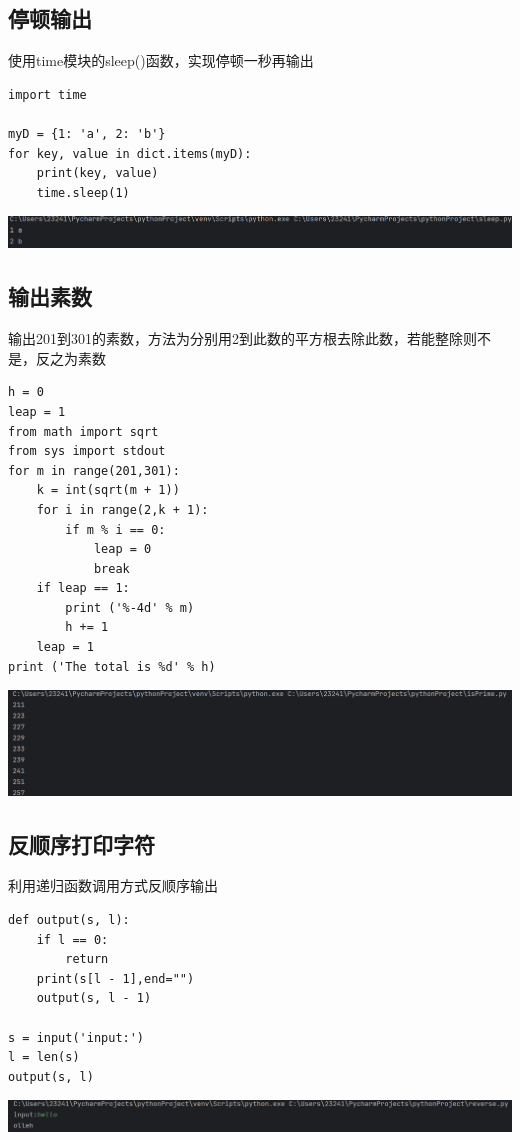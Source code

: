 \documentclass[UTF8,a4paper]{ctexart}
\begin{document}
\begin{sloppypar}
	\subsection{停顿输出}
	使用time模块的sleep()函数，实现停顿一秒再输出
	\begin{lstlisting}
import time

myD = {1: 'a', 2: 'b'}
for key, value in dict.items(myD):
    print(key, value)
    time.sleep(1)
    \end{lstlisting}
	
	\includegraphics[width = 16cm]{8}
	
	\subsection{输出素数}
	输出201到301的素数，方法为分别用2到此数的平方根去除此数，若能整除则不是，反之为素数
	\begin{lstlisting}
h = 0
leap = 1
from math import sqrt
from sys import stdout
for m in range(201,301):
    k = int(sqrt(m + 1))
    for i in range(2,k + 1):
        if m % i == 0:
            leap = 0
            break
    if leap == 1:
        print ('%-4d' % m)
        h += 1
    leap = 1
print ('The total is %d' % h)
	\end{lstlisting}
	\includegraphics[width = 16cm]{9}
	
	\subsection{反顺序打印字符}
	利用递归函数调用方式反顺序输出
	\begin{lstlisting}
def output(s, l):
    if l == 0:
        return
    print(s[l - 1],end="")
    output(s, l - 1)

s = input('input:')
l = len(s)
output(s, l)
	\end{lstlisting}
	
	\includegraphics[width = 16cm]{10}
	

\end{sloppypar}
\end{document}
